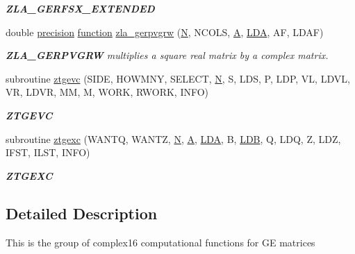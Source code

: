 \begin{DoxyCompactItemize}
\begin{DoxyCompactList}\small\item\em {\bfseries Z\+L\+A\+\_\+\+G\+E\+R\+F\+S\+X\+\_\+\+E\+X\+T\+E\+N\+D\+E\+D} \end{DoxyCompactList}\item 
double \hyperlink{numinquire_8h_a2c8e616467665d0b2814d4c1589ba74e}{precision} \hyperlink{afunc_8m_a7b5e596df91eadea6c537c0825e894a7}{function} \hyperlink{group__complex16GEcomputational_gaeb351cf702ddfd6e6a58f2063cea469e}{zla\+\_\+gerpvgrw} (\hyperlink{polmisc_8c_a0240ac851181b84ac374872dc5434ee4}{N}, N\+C\+O\+L\+S, \hyperlink{classA}{A}, \hyperlink{example__user_8c_ae946da542ce0db94dced19b2ecefd1aa}{L\+D\+A}, A\+F, L\+D\+A\+F)
\begin{DoxyCompactList}\small\item\em {\bfseries Z\+L\+A\+\_\+\+G\+E\+R\+P\+V\+G\+R\+W} multiplies a square real matrix by a complex matrix. \end{DoxyCompactList}\item 
subroutine \hyperlink{group__complex16GEcomputational_ga2a837a77c5ce9171f8d29a3955ba645f}{ztgevc} (S\+I\+D\+E, H\+O\+W\+M\+N\+Y, S\+E\+L\+E\+C\+T, \hyperlink{polmisc_8c_a0240ac851181b84ac374872dc5434ee4}{N}, S, L\+D\+S, P, L\+D\+P, V\+L, L\+D\+V\+L, V\+R, L\+D\+V\+R, M\+M, M, W\+O\+R\+K, R\+W\+O\+R\+K, I\+N\+F\+O)
\begin{DoxyCompactList}\small\item\em {\bfseries Z\+T\+G\+E\+V\+C} \end{DoxyCompactList}\item 
subroutine \hyperlink{group__complex16GEcomputational_ga8486feee84daa39f76895fadb230b108}{ztgexc} (W\+A\+N\+T\+Q, W\+A\+N\+T\+Z, \hyperlink{polmisc_8c_a0240ac851181b84ac374872dc5434ee4}{N}, \hyperlink{classA}{A}, \hyperlink{example__user_8c_ae946da542ce0db94dced19b2ecefd1aa}{L\+D\+A}, B, \hyperlink{example__user_8c_a50e90a7104df172b5a89a06c47fcca04}{L\+D\+B}, Q, L\+D\+Q, Z, L\+D\+Z, I\+F\+S\+T, I\+L\+S\+T, I\+N\+F\+O)
\begin{DoxyCompactList}\small\item\em {\bfseries Z\+T\+G\+E\+X\+C} \end{DoxyCompactList}\end{DoxyCompactItemize}


\subsection{Detailed Description}
This is the group of complex16 computational functions for G\+E matrices 

